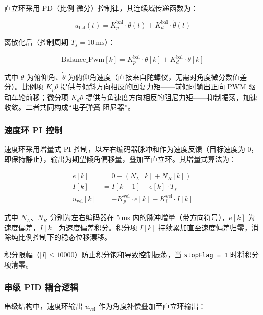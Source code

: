 \documentclass[12pt,a4paper,UTF8]{ctexrep}
\begin{document}
直立环采用 PD（比例-微分）控制律，其连续域传递函数为：

\begin{equation}
  u_{\text{bal}}(t) = K_p^{\text{bal}} \cdot \theta(t)
                    + K_d^{\text{bal}} \cdot \dot{\theta}(t)
\end{equation}

离散化后（控制周期 $T_s = 10\,\text{ms}$）：

\begin{equation}
  \text{Balance\_Pwm}[k] = K_p^{\text{bal}} \cdot \theta[k]
                         + K_d^{\text{bal}} \cdot \dot{\theta}[k]
\end{equation}

式中 $\theta$ 为俯仰角、$\dot{\theta}$ 为俯仰角速度（直接来自陀螺仪，无需对角度微分数值差分）。比例项 $K_p\theta$ 提供与倾斜方向相反的回复力矩——前倾时输出正向 PWM 驱动车轮前移；微分项 $K_d\dot{\theta}$ 提供与角速度方向相反的阻尼力矩——抑制振荡，加速收敛。二者共同构成“电子弹簧-阻尼器”。

\subsubsection{速度环 PI 控制}

速度环采用增量式 PI 控制，以左右编码器脉冲和作为速度反馈（目标速度为 0，即保持静止），输出为期望倾角偏移量，叠加至直立环。其增量式算法为：

\begin{equation}
  \begin{aligned}
    e[k] &= 0 - (N_L[k] + N_R[k]) \\
    I[k] &= I[k-1] + e[k] \cdot T_s \\
    u_{\text{vel}}[k] &= -K_p^{\text{vel}} \cdot e[k]
                       - K_i^{\text{vel}} \cdot I[k]
  \end{aligned}
\end{equation}

式中 $N_L$、$N_R$ 分别为左右编码器在 5\,ms 内的脉冲增量（带方向符号），$e[k]$ 为速度偏差，$I[k]$ 为速度偏差积分。积分项 $I[k]$ 持续累加直至速度偏差归零，消除纯比例控制下的稳态位移漂移。

积分限幅（$|I| \leq 10000$）防止积分饱和导致控制振荡，当 \texttt{stopFlag = 1} 时将积分项清零。

\subsubsection{串级 PID 耦合逻辑}

串级结构中，速度环输出 $u_{\text{vel}}$ 作为角度补偿叠加至直立环输出：
\end{document}
